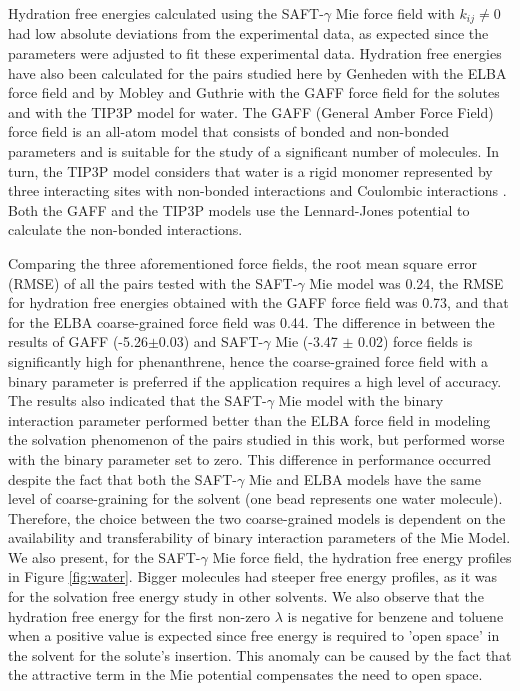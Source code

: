 \documentclass[final,12p,times,twocolumn]{elsarticle}
\begin{document}
Hydration free energies calculated using the SAFT-$\gamma$ Mie force field with $k_{ij} \neq 0$ had low absolute deviations from the experimental data, as expected since the parameters were adjusted to fit these experimental data. Hydration free energies have also been calculated for the pairs studied here by Genheden \cite{doi:10.1021/acs.jctc.5b00963} with the ELBA force field and by Mobley and Guthrie \cite{PMID:24928188} with the GAFF force field for the solutes and with the TIP3P model for water. The GAFF (General Amber Force Field) force field is an all-atom model that consists of bonded and non-bonded parameters and is suitable for the study of a significant number of molecules. In turn, the TIP3P model considers that water is a rigid monomer represented by three interacting sites with non-bonded interactions and Coulombic interactions \cite{doi:10.1063/1.445869}. Both the GAFF and the TIP3P models use the Lennard-Jones potential to calculate the non-bonded interactions.

Comparing the three aforementioned force fields, the root mean square error (RMSE) of all the pairs tested with the SAFT-$\gamma$ Mie model was  0.24, the RMSE for hydration free energies obtained with the GAFF force field was 0.73, and that for the ELBA coarse-grained force field was 0.44. The difference in between the results of GAFF (-5.26$\pm$0.03) and SAFT-$\gamma$ Mie (-3.47 $\pm$ 0.02) force fields is significantly high for phenanthrene, hence the coarse-grained force field with a binary parameter is preferred if the application requires a high level of accuracy. The results also indicated that the SAFT-$\gamma$ Mie model with the binary interaction parameter performed better than the ELBA force field in modeling the solvation phenomenon of the pairs studied in this work, but performed worse with the binary parameter set to zero. This difference in performance occurred despite the fact that both the SAFT-$\gamma$ Mie and ELBA models have the same level of coarse-graining for the solvent (one bead represents one water molecule). Therefore, the choice between the two coarse-grained models is dependent on the availability and transferability of binary interaction parameters of the Mie Model. We also present, for the SAFT-$\gamma$ Mie force field, the hydration free energy profiles in Figure \ref{fig:water}. Bigger molecules had steeper free energy profiles, as it was for the solvation free energy study in other solvents. We also observe that the hydration free energy for the first non-zero $\lambda$ is negative for benzene and toluene when a positive value is expected since free energy is required to 'open space' in the solvent for the solute's insertion. This anomaly can be caused by the fact that the attractive term in the Mie potential compensates the need to open space. 
	
\end{document}
